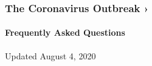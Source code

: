 \href{https://www.nytimes.com/news-event/coronavirus?action=click\&pgtype=Article\&state=default\&region=MAIN_CONTENT_3\&context=storylines_faq}{}

\hypertarget{the-coronavirus-outbreak-}{%
\subsubsection{The Coronavirus Outbreak
›}\label{the-coronavirus-outbreak-}}

\hypertarget{frequently-asked-questions}{%
\paragraph{Frequently Asked
Questions}\label{frequently-asked-questions}}

Updated August 4, 2020


